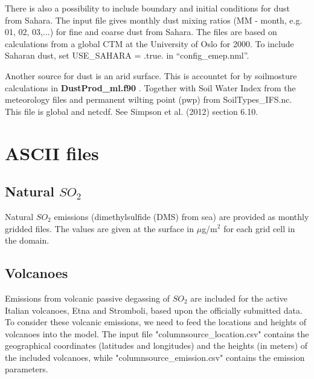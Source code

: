\documentclass[a4paper,12pt]{report}
\begin{document}
There is also a possibility to include boundary and initial conditions for dust from Sahara. 
The input file gives monthly dust mixing 
ratios (MM - month, e.g. 01, 02, 03,...) for fine and coarse dust from Sahara. The files are based on calculations 
from a global CTM at the University of Oslo for 2000. 
To include Saharan dust, set USE\_SAHARA = .true. in ``config\_emep.nml''.

Another source for dust is an arid surface. This is accountet for by soilmosture calculations in {\bf DustProd\_ml.f90 }. 
Together with Soil Water Index from the meteorology files and permanent wilting point (pwp) from SoilTypes\_IFS.nc. 
This file is global and netcdf. See Simpson et al. (2012) section 6.10.



\section{ASCII files}


% 
% 
% 
% 



\subsection{Natural $SO_2$}
Natural $SO_2$ emissions (dimethylsulfide (DMS) from sea) are provided 
as monthly gridded files.  
The values are given at the surface in $\mu$g/m$^2$ for each grid cell in the domain. 

\subsection{Volcanoes}

Emissions from volcanic passive degassing of $SO_2$ are included for
the active Italian volcanoes, Etna and Stromboli, based upon the
officially submitted data.
To consider these volcanic emissions, we need to feed the locations
and heights of volcanoes into the model. The input file
"columnsource\_location.csv" contains the geographical coordinates
(latitudes and longitudes) and 
the heights (in meters) of the
included volcanoes, while "columnsource\_emission.csv" contains the
emission parameters.
\end{document}
